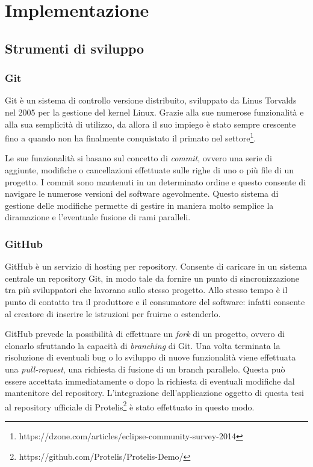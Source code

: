\section{Implementazione}

\subsection{Strumenti di sviluppo}

\subsubsection{Git}

Git è un sistema di controllo versione distribuito, sviluppato da Linus Torvalds
nel 2005 per la gestione del kernel Linux. Grazie alla sue numerose funzionalità
e alla sua semplicità di utilizzo, da allora il suo impiego è stato sempre
crescente fino a quando non ha finalmente conquistato il primato nel
settore\footnote{https://dzone.com/articles/eclipse-community-survey-2014}.

Le sue funzionalità si basano sul concetto di \textit{commit}, ovvero una serie
di aggiunte, modifiche o cancellazioni effettuate sulle righe di uno o più file
di un progetto. I commit sono mantenuti in un determinato ordine e questo
consente di navigare le numerose versioni del software agevolmente. Questo
sistema di gestione delle modifiche permette di gestire in maniera molto
semplice la diramazione e l'eventuale fusione di rami paralleli.

\subsubsection{GitHub}

GitHub è un servizio di hosting per repository. Consente di caricare in un
sistema centrale un repository Git, in modo tale da fornire un punto di
sincronizzazione tra più sviluppatori che lavorano sullo stesso progetto. Allo
stesso tempo è il punto di contatto tra il produttore e il consumatore del
software: infatti consente al creatore di inserire le istruzioni per fruirne o
estenderlo.

GitHub prevede la possibilità di effettuare un \textit{fork} di un
progetto, ovvero di clonarlo sfruttando la capacità di \textit{branching} di
Git. Una volta terminata la risoluzione di eventuali bug o lo sviluppo di nuove
funzionalità viene effettuata una \textit{pull-request}, una richiesta di
fusione di un branch parallelo. Questa può essere accettata immediatamente o
dopo la richiesta di eventuali modifiche dal mantenitore del repository.
L'integrazione dell'applicazione oggetto di questa tesi al repository ufficiale di
Protelis\footnote{https://github.com/Protelis/Protelis-Demo/} è stato effettuato in questo modo.

